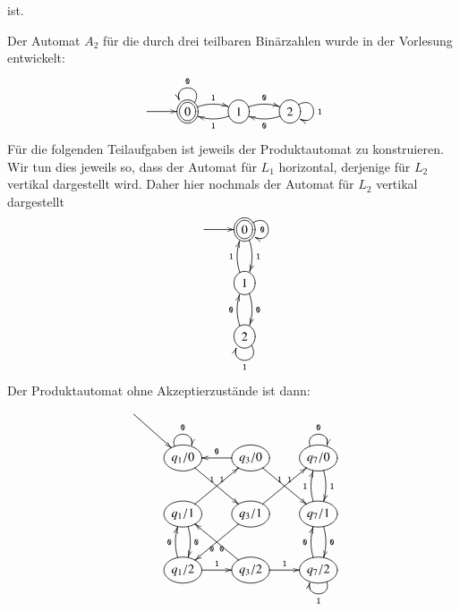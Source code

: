 \begin{loesung}
\begin{teilaufgaben}
\begin{center}
\end{center}
ist.
\item
Der Automat $A_2$ für die durch drei teilbaren Binärzahlen wurde in der
Vorlesung entwickelt:
\[
\entrymodifiers={++[o][F]}
\xymatrix{
*+\txt{}\ar[r]
        &*++[o][F=]{0} \ar@(ur,ul)_{\tt 0} \ar@/^/[r]^{\tt 1}
                &{1} \ar@/^/[r]^{\tt 0} \ar@/^/[l]^{\tt 1}
                        &{2} \ar@/^/[l]^{\tt 0} \ar@(ur,dr)^{\tt 1}
}
\]
Für die folgenden Teilaufgaben ist jeweils der Produktautomat
zu konstruieren. Wir tun dies jeweils so, dass der Automat für
$L_1$ horizontal, derjenige für $L_2$ vertikal dargestellt wird.
Daher hier nochmals der Automat für $L_2$ vertikal dargestellt
\[
\entrymodifiers={++[o][F]}
\xymatrix{
*+\txt{}\ar[r]
        &*++[o][F=]{0} \ar@(ur,dr)_{\tt 0} \ar@/^/[d]^{\tt 1}
\\
*+\txt{}
        &{1} \ar@/^/[d]^{\tt 0} \ar@/^/[u]^{\tt 1}
\\
*+\txt{}
        &{2} \ar@/^/[u]^{\tt 0} \ar@(dr,dl)^{\tt 1}
}
\]
Der Produktautomat ohne Akzeptierzustände ist dann:
\[
\entrymodifiers={++[o][F]}
\xymatrix{
*+\txt{}\ar[dr]
\\
*+\txt{}
        &{q_1/0} \ar@(ul,ur)^{\tt 0} \ar[dr]^{\tt 1}
                &{q_3/0} \ar[l]_{\tt 0} \ar[dr]^{\tt 1}
                        &{q_7/0} \ar@(ul,ur)^{\tt 0} \ar@/^/[d]^{\tt 1}
\\
*+\txt{}
        &{q_1/1} \ar@/^/[d]^{\tt 0} \ar[ur]^{\tt 1}
                &{q_3/1} \ar[dl]^{\tt 0} \ar[ur]^{\tt 1}
                        &{q_7/1} \ar@/^/[d]^{\tt 0} \ar@/^/[u]^{\tt 1}
\\
*+\txt{}
        &{q_1/2} \ar@/^/[u]^{\tt 0} \ar[r]^{\tt 1}
                &{q_3/2} \ar[ul]^{\tt 0} \ar[r]^{\tt 1}
                        &{q_7/2} \ar@/^/[u]^{\tt 0} \ar@(dr,dl)^{\tt 1}
\\
}
\]


\end{teilaufgaben}
\end{loesung}
